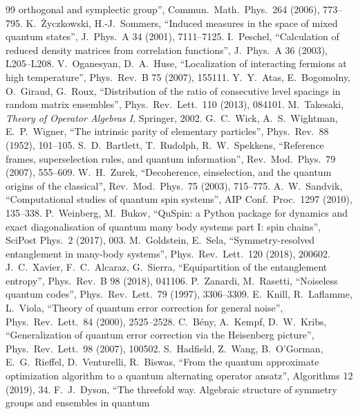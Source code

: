\documentclass[11pt]{article}
\begin{document}
{\begin{thebibliography}{99}
  orthogonal and symplectic group'', Commun.\ Math.\ Phys.\ 264 (2006), 773--795.
 K.~\.Zyczkowski, H.-J.~Sommers, ``Induced measures in the space of mixed quantum
  states'', J.\ Phys.\ A 34 (2001), 7111--7125.
 I.~Peschel, ``Calculation of reduced density matrices from correlation functions'',
  J.\ Phys.\ A 36 (2003), L205--L208.
 V.~Oganesyan, D.~A.~Huse, ``Localization of interacting fermions at high temperature'',
  Phys.\ Rev.\ B 75 (2007), 155111.
 Y.~Y.~Atas, E.~Bogomolny, O.~Giraud, G.~Roux, ``Distribution of the ratio of consecutive
  level spacings in random matrix ensembles'', Phys.\ Rev.\ Lett.\ 110 (2013), 084101.
 M.~Takesaki, \emph{Theory of Operator Algebras I}, Springer, 2002.
 G.~C.~Wick, A.~S.~Wightman, E.~P.~Wigner, ``The intrinsic parity of elementary particles'',
  Phys.\ Rev.\ 88 (1952), 101--105.
 S.~D.~Bartlett, T.~Rudolph, R.~W.~Spekkens, ``Reference frames, superselection rules, and
  quantum information'', Rev.\ Mod.\ Phys.\ 79 (2007), 555--609.
 W.~H.~Zurek, ``Decoherence, einselection, and the quantum origins of the classical'',
  Rev.\ Mod.\ Phys.\ 75 (2003), 715--775.
 A.~W.~Sandvik, ``Computational studies of quantum spin systems'', AIP Conf.\ Proc.\ 1297
  (2010), 135--338.
 P.~Weinberg, M.~Bukov, ``QuSpin: a Python package for dynamics and exact diagonalisation of
  quantum many body systems part I: spin chains'', SciPost Phys.\ 2 (2017), 003.
 M.~Goldstein, E.~Sela, ``Symmetry-resolved entanglement in many-body systems'',
  Phys.\ Rev.\ Lett.\ 120 (2018), 200602.
 J.~C.~Xavier, F.~C.~Alcaraz, G.~Sierra, ``Equipartition of the entanglement entropy'',
  Phys.\ Rev.\ B 98 (2018), 041106.
 P.~Zanardi, M.~Rasetti, ``Noiseless quantum codes'', Phys.\ Rev.\ Lett.\ 79 (1997), 3306--3309.
 E.~Knill, R.~Laflamme, L.~Viola, ``Theory of quantum error correction for general noise'',
  Phys.\ Rev.\ Lett.\ 84 (2000), 2525--2528.
 C.~B\'eny, A.~Kempf, D.~W.~Kribs, ``Generalization of quantum error correction via the Heisenberg
  picture'', Phys.\ Rev.\ Lett.\ 98 (2007), 100502.
 S.~Hadfield, Z.~Wang, B.~O'Gorman, E.~G.~Rieffel, D.~Venturelli, R.~Biswas, ``From the quantum
  approximate optimization algorithm to a quantum alternating operator ansatz'', Algorithms 12 (2019), 34.
 F.~J.~Dyson, ``The threefold way. Algebraic structure of symmetry groups and ensembles in quantum

\end{thebibliography}}
\end{document}
